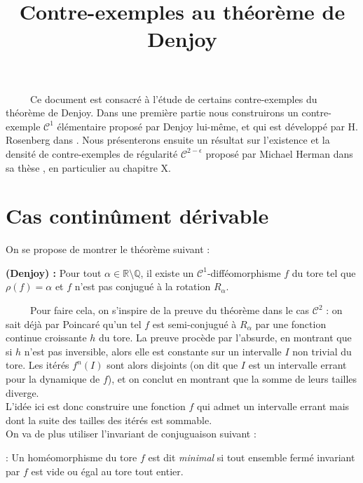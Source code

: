\documentclass[11pt,a4paper]{article}
\title{\textbf{Contre-exemples au théorème de Denjoy }}
\date{}
\begin{document}
\maketitle

\ \ \ \ \ Ce document est consacré à l'étude de certains contre-exemples du théorème de Denjoy. Dans une première partie nous construirons un contre-exemple $\mathcal{C}^1$ élémentaire proposé par Denjoy lui-même, et qui est développé par H. Rosenberg dans \cite{rosenberg}. Nous présenterons ensuite un résultat sur l'existence et la densité de contre-exemples de régularité $\mathcal{C}^{2-\epsilon}$ proposé par Michael Herman dans sa thèse \cite{herman}, en particulier au chapitre X.

\section{Cas continûment dérivable}

On se propose de montrer le théorème suivant :

\begin{theorem}\textbf{(Denjoy) : }
Pour tout $\alpha \in \mathbb{R} \setminus \mathbb{Q}$, il existe un $\mathcal{C}^1$-difféomorphisme $f$ du tore tel que $\rho(f)=\alpha$ et $f$ n'est pas conjugué à la rotation $R_\alpha$.
\end{theorem}

\ \ \ \ \ Pour faire cela, on s'inspire de la preuve du théorème dans le cas $\mathcal{C}^2$ : on sait déjà par Poincaré qu'un tel $f$ est semi-conjugué à $R_\alpha$ par une fonction continue croissante $h$ du tore. La preuve procède par l'absurde, en montrant que si $h$ n'est pas inversible, alors elle est constante sur un intervalle $I$ non trivial du tore. Les itérés $f^n(I)$ sont alors disjoints (on dit que $I$ est un intervalle errant pour la dynamique de $f$), et on conclut en montrant que la somme de leurs tailles diverge. \\ 
L'idée ici est donc construire une fonction $f$ qui admet un intervalle errant mais dont la suite des tailles des itérés est sommable. \\

On va de plus utiliser l'invariant de conjuguaison suivant : 

\begin{defin} : Un homéomorphisme du tore $f$ est dit \textit{minimal} si tout ensemble fermé invariant par  $f$ est vide ou égal au tore tout entier. 
\end{defin}
\end{document}
